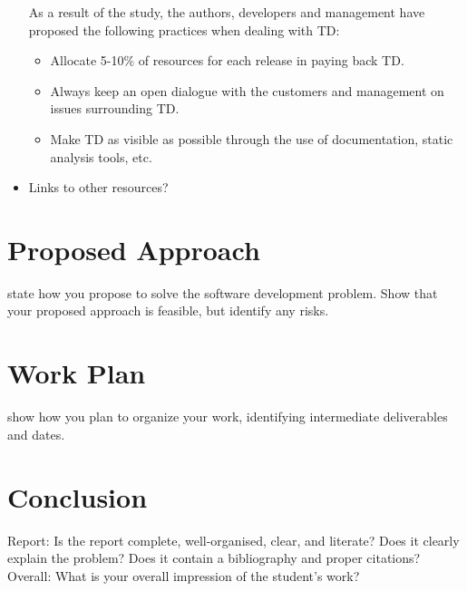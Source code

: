 \documentclass{mprop}
\begin{document}
\begin{itemize}
As a result of the study, the authors, developers and management have proposed the following practices when dealing with TD:
\begin{itemize}
	\item Allocate 5-10\% of resources for each release in paying back TD.
	\item Always keep an open dialogue with the customers and management on issues surrounding TD.
	\item Make TD as visible as possible through the use of documentation, static analysis tools, etc.
\end{itemize}
\item Links to other resources? \\
\end{itemize}


\section{Proposed Approach}

state how you propose to solve the software development problem. Show that your proposed approach is feasible, but identify any risks.

\section{Work Plan}

show how you plan to organize your work, identifying intermediate deliverables and dates.

\section{Conclusion}

Report: Is the report complete, well-organised, clear, and literate? Does it clearly explain the problem? Does it contain a bibliography and proper citations?
Overall: What is your overall impression of the student’s work?



\end{document}
